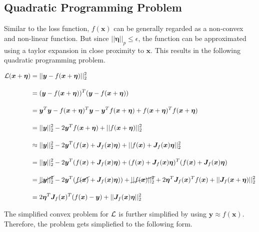 
\subsection{Quadratic Programming Problem}\label{sec:section}


Similar to the loss function,
$ f(\bm{x}) $ can be generally regarded as a non-convex and non-linear function. But since $ \lvert\lvert \bm{\eta} \rvert\rvert_p \leq \epsilon $,
the function can be approximated using a taylor expansion in close proximity to $\bm{x}$. This results in the following
quadratic programming problem.


\begin{equation}
\begin{aligned}
\mathcal{L}(\bm{x} + \bm{\eta}) &= \lvert\lvert \bm{y} - f(\bm{x} + \bm{\eta}) \rvert\rvert^2_2 \\[10pt]
&= (\bm{y} - f(\bm{x} + \bm{\eta}))^T(\bm{y} - f(\bm{x} + \bm{\eta})) \\[10pt]
&= \bm{y}^T\bm{y} - f(\bm{x} + \bm{\eta})^T\bm{y} - \bm{y}^T f(\bm{x} + \bm{\eta}) + f(\bm{x} + \bm{\eta})^Tf(\bm{x} + \bm{\eta}) \\[10pt]
&= \lvert\lvert \bm{y} \rvert\rvert^2_2 - 2 \bm{y}^T f(\bm{x} + \bm{\eta}) + \lvert\lvert f(\bm{x} + \bm{\eta}) \rvert\rvert^2_2 \\[10pt]
&\approx \lvert\lvert \bm{y} \rvert\rvert^2_2 - 2 \bm{y}^T (f(\bm{x}) + \bm{J}_f(\bm{x})\bm{\eta}) + \lvert\lvert f(\bm{x}) + \bm{J}_f(\bm{x}) \bm{\eta} \rvert\rvert^2_2 \\[10pt]
&= \lvert\lvert \bm{y} \rvert\rvert^2_2 - 2 \bm{y}^T (f(\bm{x}) + \bm{J}_f(\bm{x})\bm{\eta}) + (f(\bm{x}) + \bm{J}_f(\bm{x})\bm{\eta})^T(f(\bm{x}) + \bm{J}_f(\bm{x})\bm{\eta}) \\[10pt]
&= \cancel{ \lvert\lvert \bm{y} \rvert\rvert^2_2 } - 2 \bm{y}^T ( \cancel{ f(\bm{x}) } + \bm{J}_f(\bm{x})\bm{\eta})) + \cancel{  \lvert\lvert f(\bm{x}) \rvert\rvert^2_2 } + 2 \bm{\eta}^T \bm{J}_f(\bm{x})^Tf(\bm{x}) + \lvert\lvert \bm{J}_f(\bm{x}+\bm{\eta}) \rvert\rvert^2_2 \\[10pt]
&= 2 \bm{\eta}^T \bm{J}_f(\bm{x})^T (f(\bm{x}) - \bm{y}) + \lvert\lvert \bm{J}_f(\bm{x}) \bm{\eta} \rvert\rvert^2_2 \\
\end{aligned}
\label{taylorquadratic}
\end{equation}

\begingroup
The simplified convex problem for $\mathcal{L}$ is further simplified by using $\bm{y} \approx f(\bm{x})$.
Therefore, the problem gets simpliefied to the following form.
\endgroup

